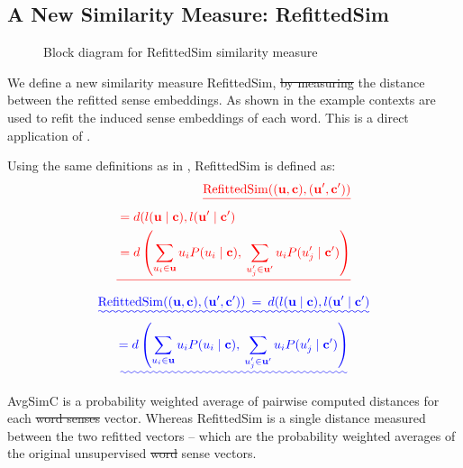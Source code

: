 \documentclass{article} %
\renewcommand{\c}{\mathbf{c}}
\renewcommand{\u}{\mathbf{u}}
\providecommand{\DIFadd}[1]{{\protect\color{blue}\uwave{#1}}} %
\providecommand{\DIFdel}[1]{{\protect\color{red}\sout{#1}}}                      %
\providecommand{\DIFaddbegin}{} %
\providecommand{\DIFaddend}{} %
\providecommand{\DIFdelbegin}{} %
\providecommand{\DIFdelend}{} %
\begin{document}
\DIFdelend \subsection{A New Similarity Measure: RefittedSim}\label{RefittedSimVsAvgSimC}
\begin{figure}
	\begin{adjustbox}{max width=\columnwidth}
	
	\end{adjustbox}
	\caption{Block diagram for RefittedSim similarity measure} \label{diaRefittedSim}
\end{figure}
We define a new similarity measure RefittedSim, \DIFdelbegin \DIFdel{by measuring }\DIFdelend \DIFaddbegin \DIFadd{as }\DIFaddend the distance between the refitted sense embeddings.
As shown in  the example contexts are used to refit the induced sense embeddings of each word.
This is a direct application of  .

Using the same definitions as in , RefittedSim is defined as:
\DIFdelbegin \begin{align*} \DIFdel{%
\mathrm{RefittedSim}((\u,\c),(\u^{\prime},\c^{\prime}))}\\
\DIFdel{\begin{aligned}
&= d(l(\u \mid \c), l(\u^\prime \mid \c^\prime)\\
&= d\left(
\sum_{u_{i}\in\u}u_{i}P(u_{i}\mid\c),\:
\sum_{u_{j}^{\prime}\in\u^{\prime}}u_{i}P(u_{j}^{\prime}\mid\c^{\prime})\right)
\end{aligned}
}\end{align*}
\DIFdelend \DIFaddbegin \begin{multline} \DIFadd{\label{eq:refittedsim}
\mathrm{RefittedSim}((\u,\c),(\u^{\prime},\c^{\prime}))
\:=\: d(l(\u \mid \c), l(\u^\prime \mid \c^\prime)}\\
\DIFadd{= d\left(
\sum_{u_{i}\in\u}u_{i}P(u_{i}\mid\c),\:
\sum_{u_{j}^{\prime}\in\u^{\prime}}u_{i}P(u_{j}^{\prime}\mid\c^{\prime})\right)
}\end{multline}
\DIFaddend 

AvgSimC is a probability weighted average of pairwise computed distances for each \DIFdelbegin \DIFdel{word senses }\DIFdelend \DIFaddbegin \DIFadd{sense }\DIFaddend vector.
Whereas RefittedSim is a single distance measured between the two refitted vectors -- which are the probability weighted averages of the original unsupervised \DIFdelbegin \DIFdel{word }\DIFdelend sense vectors.
\end{document}
